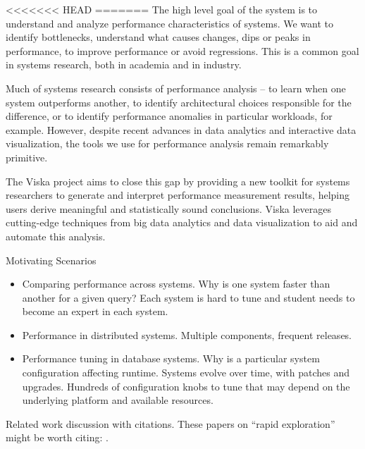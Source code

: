 <<<<<<< HEAD
\vspace{-2mm}
=======
The high level goal of the system is to understand and analyze performance
characteristics of systems. We want to identify bottlenecks, understand
what causes changes, dips or peaks in performance, to improve performance
or avoid regressions. This is a common goal in systems research, both in
academia and in industry. 

Much of systems research consists of performance analysis -- to learn
when one system outperforms another, to identify architectural choices
responsible for the difference, or to identify performance anomalies
in particular workloads, for example. However, despite recent advances
in data analytics and interactive data visualization, the tools we use
for performance analysis remain remarkably primitive.

The Viska project aims to close this gap by providing a new toolkit
for systems researchers to generate and interpret performance
measurement results, helping users derive meaningful and statistically
sound conclusions. Viska leverages cutting-edge techniques from big
data analytics and data visualization to aid and automate this
analysis.

Motivating Scenarios
\begin{itemize}
\item Comparing performance across systems. Why is one system faster than 
another for a given query? Each system is hard to tune and student needs
to become an expert in each system.
\item Performance in distributed systems. Multiple components, frequent
releases.
\item Performance tuning in database systems. Why is a particular system
configuration affecting runtime. Systems evolve over time, with patches
and upgrades. Hundreds of configuration knobs to tune that may depend on
the underlying platform and available resources.
\end{itemize}

Related work discussion with citations. These papers on ``rapid exploration''
might be worth citing: \cite{binning2017towards,chirigati2016data,vartak2014seedb}.

